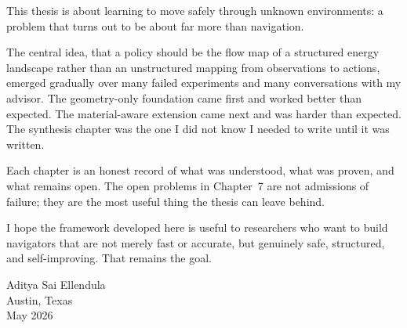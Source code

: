 \begin{preface}
This thesis is about learning to move safely through unknown
environments: a problem that turns out to be about far more
than navigation.

The central idea, that a policy should be the flow map of a
structured energy landscape rather than an unstructured mapping
from observations to actions, emerged gradually over many failed
experiments and many conversations with my advisor.
The geometry-only foundation came first and worked better than
expected.
The material-aware extension came next and was harder than expected.
The synthesis chapter was the one I did not know I needed to write
until it was written.

Each chapter is an honest record of what was understood, what was
proven, and what remains open.
The open problems in Chapter~7 are not admissions of failure;
they are the most useful thing the thesis can leave behind.

I hope the framework developed here is useful to researchers who
want to build navigators that are not merely fast or accurate,
but genuinely safe, structured, and self-improving.
That remains the goal.

\hfill Aditya Sai Ellendula\\
\hfill Austin, Texas\\
\hfill May 2026
\end{preface}
%
\utabstract

\tableofcontents   %



%
%

